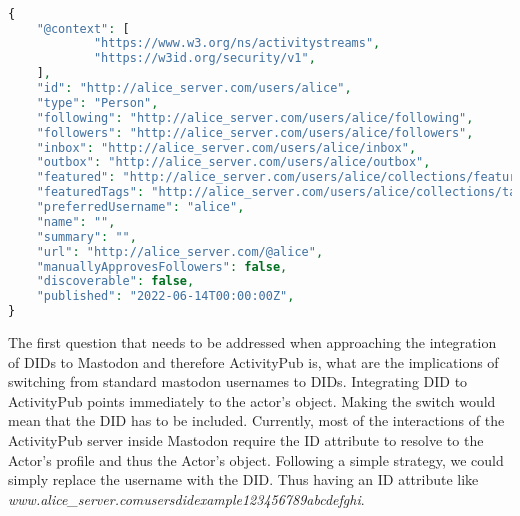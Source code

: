 \lstset{style=JSONStyle}
\begin{lstlisting}[language=PHP, caption=Alice's actor object, label=fig:alice_actor_object, float=h]

{
	"@context": [
			"https://www.w3.org/ns/activitystreams",
			"https://w3id.org/security/v1",
	],
	"id": "http://alice_server.com/users/alice",
	"type": "Person",
	"following": "http://alice_server.com/users/alice/following",
	"followers": "http://alice_server.com/users/alice/followers",
	"inbox": "http://alice_server.com/users/alice/inbox",
	"outbox": "http://alice_server.com/users/alice/outbox",
	"featured": "http://alice_server.com/users/alice/collections/featured",
	"featuredTags": "http://alice_server.com/users/alice/collections/tags",
	"preferredUsername": "alice",
	"name": "",
	"summary": "",
	"url": "http://alice_server.com/@alice",
	"manuallyApprovesFollowers": false,
	"discoverable": false,
	"published": "2022-06-14T00:00:00Z",
}


\end{lstlisting}

The first question that needs to be addressed when approaching the integration of DIDs to Mastodon and therefore ActivityPub is, what are the implications of switching from standard mastodon usernames to DIDs. Integrating DID to ActivityPub points immediately to the actor's object. Making the switch would mean that the DID has to be included. Currently, most of the interactions of the ActivityPub server inside Mastodon require the ID attribute to resolve to the Actor's profile and thus the Actor's object. Following a simple strategy, we could simply replace the username with the DID. Thus having an ID attribute like \emph{www.alice\_server.com\/users\/did\:example\:123456789abcdefghi}.

